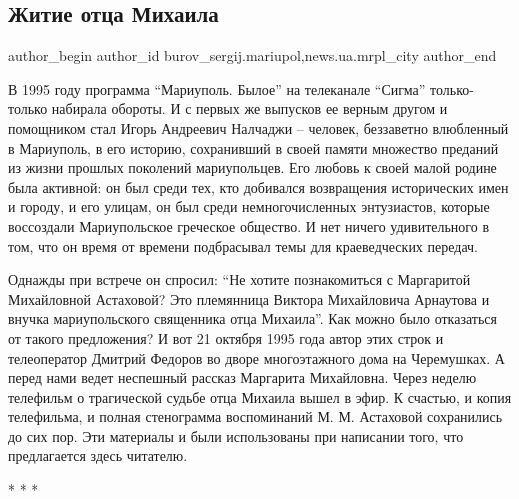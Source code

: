  
 
 
 
 
 
\subsection{Житие отца Михаила}
\label{sec:03_03_2018.stz.news.ua.mrpl_city.1.zhitie_otca_mihaila}
 
\ifcmt
 author_begin
   author_id burov_sergij.mariupol,news.ua.mrpl_city
 author_end
\fi


В 1995 году программа \enquote{Мариуполь. Былое} на телеканале \enquote{Сигма} только-только
набирала обороты. И с первых же выпусков ее верным другом и помощником стал
Игорь Андреевич Налчаджи – человек, беззаветно влюбленный в Мариуполь, в его
историю, сохранивший в своей памяти множество преданий из жизни прошлых
поколений мариупольцев. Его любовь к своей малой родине была активной: он был
среди тех, кто добивался возвращения исторических имен и городу, и его улицам,
он был среди немногочисленных энтузиастов, которые воссоздали Мариупольское
греческое общество. И нет ничего удивительного в том, что он время от времени
подбрасывал темы для краеведческих передач.

Однажды при встрече он спросил: \enquote{Не хотите познакомиться с Маргаритой
Михайловной Астаховой? Это племянница Виктора Михайловича Арнаутова и внучка
мариупольского священника отца Михаила}. Как можно было отказаться от такого
предложения? И вот 21 октября 1995 года автор этих строк и телеоператор Дмитрий
Федоров во дворе многоэтажного дома на Черемушках. А перед нами ведет неспешный
рассказ Маргарита Михайловна. Через неделю телефильм о трагической судьбе отца
Михаила вышел в эфир. К счастью, и копия телефильма, и полная стенограмма
воспоминаний М. М. Астаховой сохранились до сих пор. Эти материалы и были
использованы при написании того, что предлагается здесь читателю.

*  *  *


